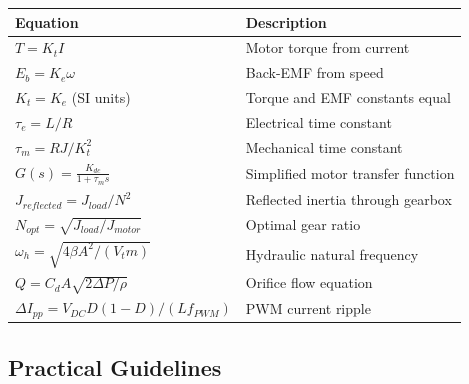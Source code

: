 \begin{center}
\begin{tabular}{ll}
\toprule
\textbf{Equation} & \textbf{Description} \\
\midrule
$T = K_t I$ & Motor torque from current \\
$E_b = K_e \omega$ & Back-EMF from speed \\
$K_t = K_e$ (SI units) & Torque and EMF constants equal \\
$\tau_e = L/R$ & Electrical time constant \\
$\tau_m = RJ/K_t^2$ & Mechanical time constant \\
$G(s) = \frac{K_{dc}}{1 + \tau_m s}$ & Simplified motor transfer function \\
$J_{reflected} = J_{load}/N^2$ & Reflected inertia through gearbox \\
$N_{opt} = \sqrt{J_{load}/J_{motor}}$ & Optimal gear ratio \\
$\omega_h = \sqrt{4\beta A^2/(V_t m)}$ & Hydraulic natural frequency \\
$Q = C_d A \sqrt{2\Delta P/\rho}$ & Orifice flow equation \\
$\Delta I_{pp} = V_{DC} D(1-D)/(L f_{PWM})$ & PWM current ripple \\
\bottomrule
\end{tabular}
\end{center}

\subsection{Practical Guidelines}

